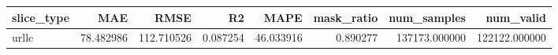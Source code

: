 \begin{tabular}{lrrrrrrr}
\toprule
slice_type & MAE & RMSE & R2 & MAPE & mask_ratio & num_samples & num_valid \\
\midrule
urllc & 78.482986 & 112.710526 & 0.087254 & 46.033916 & 0.890277 & 137173.000000 & 122122.000000 \\
\bottomrule
\end{tabular}
